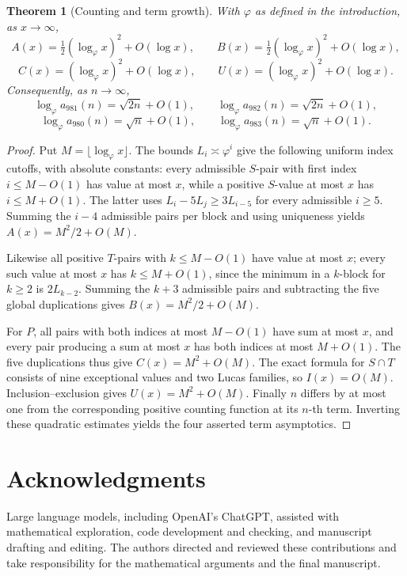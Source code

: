 \documentclass[11pt]{article}
\newtheorem{theorem}{Theorem}[section]
\begin{document}
\begin{theorem}[Counting and term growth]
\label{oeis:thm:growth}
With $\varphi$ as defined in the introduction, as $x\to\infty$,
\[
A(x)=\tfrac12(\log_\varphi x)^2+O(\log x),\qquad
B(x)=\tfrac12(\log_\varphi x)^2+O(\log x),
\]
\[
C(x)=(\log_\varphi x)^2+O(\log x),\qquad
U(x)=(\log_\varphi x)^2+O(\log x).
\]
Consequently, as \(n\to\infty\),
\[
\log_\varphi a_{981}(n)=\sqrt{2n}+O(1),\qquad
\log_\varphi a_{982}(n)=\sqrt{2n}+O(1),
\]
\[
\log_\varphi a_{980}(n)=\sqrt n+O(1),\qquad
\log_\varphi a_{983}(n)=\sqrt n+O(1).
\]
\end{theorem}
\begin{proof}
Put \(M=\lfloor\log_\varphi x\rfloor\).
The bounds \(L_i\asymp\varphi^i\) give the following
uniform index cutoffs, with absolute constants:
every admissible \(S\)-pair with first index
\(i\le M-O(1)\) has value at most \(x\), while a
positive \(S\)-value at most \(x\) has
\(i\le M+O(1)\). The latter uses
\(L_i-5L_j\ge3L_{i-5}\) for every admissible
\(i\ge5\). Summing the \(i-4\) admissible pairs
per block and using uniqueness yields
\(A(x)=M^2/2+O(M)\).

Likewise all positive \(T\)-pairs with
\(k\le M-O(1)\) have value at most \(x\);
every such value at most \(x\) has
\(k\le M+O(1)\), since the minimum in a
\(k\)-block for \(k\ge2\) is \(2L_{k-2}\).
Summing the \(k+3\) admissible pairs and
subtracting the five global duplications gives
\(B(x)=M^2/2+O(M)\).

For \(P\), all pairs with both indices
at most \(M-O(1)\) have sum at most \(x\),
and every pair producing a sum at most \(x\)
has both indices at most \(M+O(1)\).
The five duplications thus give
\(C(x)=M^2+O(M)\).
The exact formula for \(S\cap T\) consists
of nine exceptional values and two Lucas
families, so \(I(x)=O(M)\).
Inclusion--exclusion gives \(U(x)=M^2+O(M)\).
Finally \(n\) differs by at most one from
the corresponding positive counting function
at its \(n\)-th term. Inverting these
quadratic estimates yields the four asserted
term asymptotics.
\end{proof}

\section*{Acknowledgments}
Large language models, including OpenAI's ChatGPT, assisted with
mathematical exploration, code development and checking, and
manuscript drafting and editing. The authors directed and reviewed
these contributions and take responsibility for the mathematical
arguments and the final manuscript.
\end{document}
